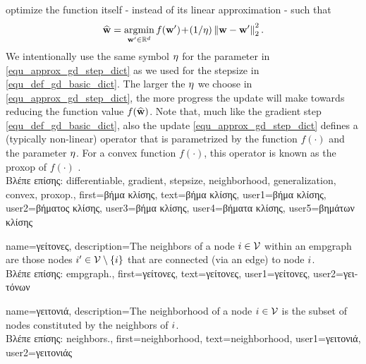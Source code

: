 {{		optimize the function itself - instead of its linear approximation - such that
		\begin{align} 
		\label{equ_approx_gd_step_dict}
		\widehat{{\bf w}} = \operatorname*{argmin}_{{\bf w}' \in \mathbb{R}^{d}} f({\bf w}')\!+\!(1/\eta)\left\Vert {{\bf w}-{\bf w}'} \right\Vert_{2}^2. 
		\end{align}
		We intentionally use the same symbol $\eta$ for the parameter in \eqref{equ_approx_gd_step_dict} 
		as we used for the \gls{stepsize} in \eqref{equ_def_gd_basic_dict}. The larger the $\eta$ we choose in 
		\eqref{equ_approx_gd_step_dict}, the more progress the update will make towards reducing the 
		function value $f(\widehat{{\bf w}})$. Note that, much like the \gls{gradient} step \eqref{equ_def_gd_basic_dict}, 
		also the update \eqref{equ_approx_gd_step_dict} defines a (typically non-linear) operator 
		that is parametrized by the function $f(\cdot)$ and the parameter $\eta$. For a \gls{convex} function 
		$f(\cdot)$, this operator is known as the \gls{proxop} of $f(\cdot)$ \cite{ProximalMethods}.\\ 
		\foreignlanguage{greek}{Βλέπε επίσης:} \gls{differentiable}, \gls{gradient}, \gls{stepsize}, \gls{neighborhood}, \gls{generalization}, \gls{convex}, \gls{proxop}.},
		first={\foreignlanguage{greek}{βήμα κλίσης}},
		text={\foreignlanguage{greek}{βήμα κλίσης}},
		user1={\foreignlanguage{greek}{βήμα κλίσης}}, %
		user2={\foreignlanguage{greek}{βήματος κλίσης}}, %
		user3={\foreignlanguage{greek}{βήμα κλίσης}}, %
		user4={\foreignlanguage{greek}{βήματα κλίσης}}, %
		user5={\foreignlanguage{greek}{βημάτων κλίσης}} %
}

{
	name={\foreignlanguage{greek}{γείτονες}},
	description={The neighbors of a node $i \in \mathcal{V}$ 
	within an \gls{empgraph} are those nodes $i' \in \mathcal{V} \setminus \{ i\}$ that are connected (via an edge) to node $i$.\\
	\foreignlanguage{greek}{Βλέπε επίσης:} \gls{empgraph}.},
	first={\foreignlanguage{greek}{γείτονες}},
	text={\foreignlanguage{greek}{γείτονες}},
	user1={\foreignlanguage{greek}{γείτονες}}, %
   	user2={\foreignlanguage{greek}{γειτόνων}} %
}

{
	name={\foreignlanguage{greek}{γειτονιά}},
	description={The neighborhood of a node $i \in \mathcal{V}$ is 
	the subset of nodes constituted by the \gls{neighbors} of $i$.\\
	\foreignlanguage{greek}{Βλέπε επίσης:} \gls{neighbors}.},
	first={neighborhood},
	text={neighborhood},
	user1={\foreignlanguage{greek}{γειτονιά}}, %
   	user2={\foreignlanguage{greek}{γειτονιάς}} %
}

